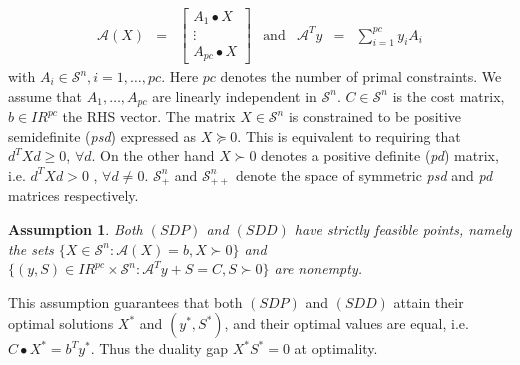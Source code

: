 \documentclass[12pt]{kluwer}
\newtheorem{assumption}{Assumption}
\newcommand{\real}{I\!\! R}
\begin{document}
\begin{article}
\begin{displaymath}
\begin{array}{ccccccc}
\mathcal{A} (X) & = & \left[ \begin{array}{c}
            A_1 \bullet X \\ \vdots \\ A_{pc} \bullet X \end{array} \right] & \mbox{and} & \mathcal{A}^Ty & = & \sum_{i=1}^{pc} y_iA_i
\end{array}
\end{displaymath}
with $ A_i \in \mathcal{S}^{n}, i = 1,\ldots,pc$. Here $pc$ denotes the number of primal constraints.
We assume that $A_1,\ldots,A_{pc}$ are linearly independent in $\mathcal{S}^n$.
$ C \in \mathcal{S}^n $ is the cost matrix, $ b \in \real^{pc} $ the RHS vector.
The matrix $X \in \mathcal{S}^n$ is constrained to be positive semidefinite ({\em psd}) expressed as $ X \succeq 0 $. This is equivalent
to
requiring that $d^TXd \ge 0$, $ \forall d$.
On the other hand $ X \succ 0 $ denotes a positive definite ({\em pd}) matrix, i.e. $ d^TXd > 0 $ , $ \forall d \neq 0 $.
$ \mathcal{S}_{+}^{n} $ and $ \mathcal{S}_{++}^{n} $ denote the space of symmetric {\em psd} and {\em pd} matrices respectively.

\begin{assumption}
\label{slater_pt}
Both $(SDP)$ and $(SDD)$ have strictly feasible points, namely the sets $\{X \in \mathcal{S}^n : \mathcal{A}(X)=b, X \succ 0 \}$
and $\{(y,S) \in \real^{pc} \times \mathcal{S}^n : \mathcal{A}^Ty+S=C, S \succ 0 \}$ are nonempty.
\end{assumption}
This assumption guarantees that both $(SDP)$ and $(SDD)$ attain their optimal solutions $X^*$ and $(y^*,S^*)$, and their optimal
values are equal, i.e. $C \bullet X^* = b^Ty^*$. Thus the duality gap $X^*S^*=0$ at optimality.


\end{article}
\end{document}
